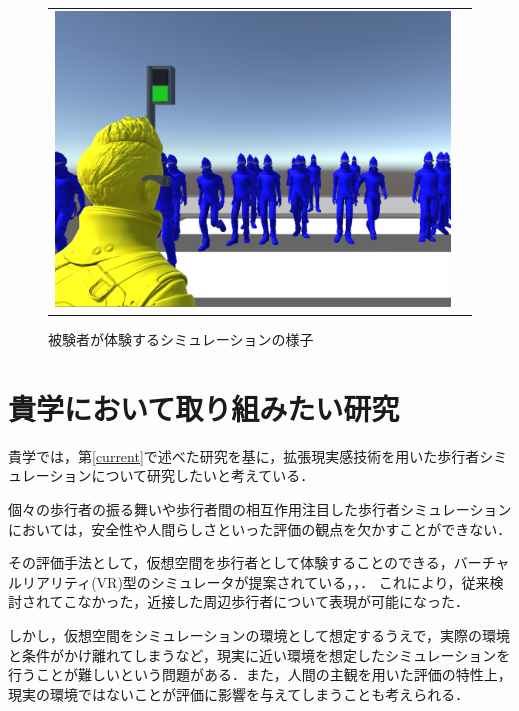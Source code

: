 \documentclass[twocolumn]{jarticle}%
\begin{document}
\begin{figure}[H]
\begin{tabular}{cc}
\begin{minipage}[t]{0.45\hsize}
        \includegraphics[keepaspectratio, scale=0.1]{images/user_view_mini.JPG}
        \caption{被験者が体験するシミュレーションの様子}
        \label{fig:user_view}
      \end{minipage}
    \end{tabular}
  \end{figure}

\vspace{-2mm}
\section{貴学において取り組みたい研究}\label{want}
貴学では，第\ref{current}で述べた研究を基に，拡張現実感技術を用いた歩行者シミュレーションについて研究したいと考えている．

個々の歩行者の振る舞いや歩行者間の相互作用注目した歩行者シミュレーションにおいては，安全性や人間らしさといった評価の観点を欠かすことができない．

その評価手法として，仮想空間を歩行者として体験することのできる，バーチャルリアリティ(VR)型のシミュレータが提案されている\cite{Iryo-VRE}，\cite{Iryo-Appli}，\cite{Iryo-VRMicroPM}．
これにより，従来検討されてこなかった，近接した周辺歩行者について表現が可能になった．

しかし，仮想空間をシミュレーションの環境として想定するうえで，実際の環境と条件がかけ離れてしまうなど，現実に近い環境を想定したシミュレーションを行うことが難しいという問題がある．また，人間の主観を用いた評価の特性上，現実の環境ではないことが評価に影響を与えてしまうことも考えられる．
\end{document}
